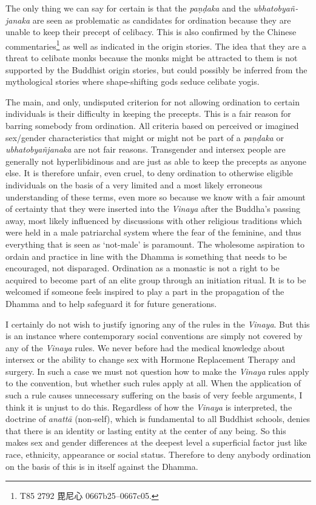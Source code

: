 The only thing we can say for certain is that the \textit{paṇḍaka} and the \textit{ubhatob­yañ­janaka} are seen as problematic as candidates for ordination because they are unable to keep their precept of celibacy. This is also confirmed by the Chinese commentaries\footnote{T85 2792 毘尼心 0667b25–0667c05.} as well as indicated in the origin stories. The idea that they are a threat to celibate monks because the monks might be attracted to them is not supported by the Buddhist origin stories, but could possibly be inferred from the mythological stories where shape-shifting gods seduce celibate yogis.

The main, and only, undisputed criterion for not allowing ordination to certain individuals is their difficulty in keeping the precepts. This is a fair reason for barring somebody from ordination. All criteria based on perceived or imagined sex/gender characteristics that might or might not be part of a \textit{paṇḍaka} or \textit{ubhatob­yañ­janaka} are not fair reasons. Transgender and intersex people are generally not hyperlibidinous and are just as able to keep the precepts as anyone else. It is therefore unfair, even cruel, to deny ordination to otherwise eligible individuals on the basis of a very limited and a most likely erroneous understanding of these terms, even more so because we know with a fair amount of certainty that they were inserted into the \textit{Vinaya} after the Buddha's passing away, most likely influenced by discussions with other religious traditions which were held in a male patriarchal system where the fear of the feminine, and thus everything that is seen as `not-male' is paramount. The wholesome aspiration to ordain and practice in line with the Dhamma is something that needs to be encouraged, not disparaged. Ordination as a monastic is not a right to be acquired to become part of an elite group through an initiation ritual. It is to be welcomed if someone feels inspired to play a part in the propagation of the Dhamma and to help safeguard it for future generations. 

I certainly do not wish to justify ignoring any of the rules in the \textit{Vinaya}. But this is an instance where contemporary social conventions are simply not covered by any of the \textit{Vinaya} rules. We never before had the medical knowledge about intersex or the ability to change sex with Hormone Replacement Therapy and surgery. In such a case we must not question how to make the \textit{Vinaya} rules apply to the convention, but whether such rules apply at all. When the application of such a rule causes unnecessary suffering on the basis of very feeble arguments, I think it is unjust to do this. Regardless of how the \textit{Vinaya} is interpreted, the doctrine of \textit{anattā} (non-self), which is fundamental to all Buddhist schools, denies that there is an identity or lasting entity at the center of any being. So this makes sex and gender differences at the deepest level a superficial factor just like race, ethnicity, appearance or social status. Therefore to deny anybody ordination on the basis of this is in itself against the Dhamma.

